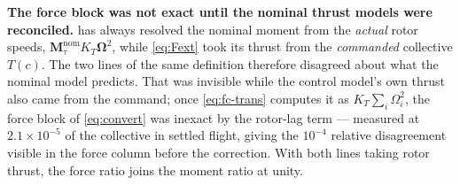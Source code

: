 \documentclass[11pt,a4paper,twoside,openright]{report}
\makeatletter
\renewcommand{\subsection}{\FloatBarrier\old@subsection}}
\renewcommand{\vec}[1]{\bm{#1}}
\newcommand{\mat}[1]{\bm{#1}}
\theoremstyle{plain}
\theoremstyle{definition}
\theoremstyle{remark}
\makeatother
\begin{document}
	\begin{cautionbox}
		\textbf{The force block was not exact until the nominal thrust models were
		reconciled.}  has always resolved the nominal moment from the
		\emph{actual} rotor speeds, $\mat M_\tau^\mathrm{nom}K_T\vec\Omega^2$, while
		\cref{eq:Fext} took its thrust from the \emph{commanded} collective $T(c)$.
		The two lines of the same definition therefore disagreed about what the
		nominal model predicts. That was invisible while the control model's own
		thrust also came from the command; once \cref{eq:fc-trans} computes it as
		$K_T\sum_i\Omega_i^2$, the force block of \cref{eq:convert} was inexact by the
		rotor-lag term --- measured at $2.1\times10^{-5}$ of the collective in settled
		flight, giving the $10^{-4}$ relative disagreement visible in the force column
		before the correction. With both lines taking rotor thrust, the force ratio
		joins the moment ratio at unity.
	\end{cautionbox}

	\subsection{Closed loop}
\end{document}
